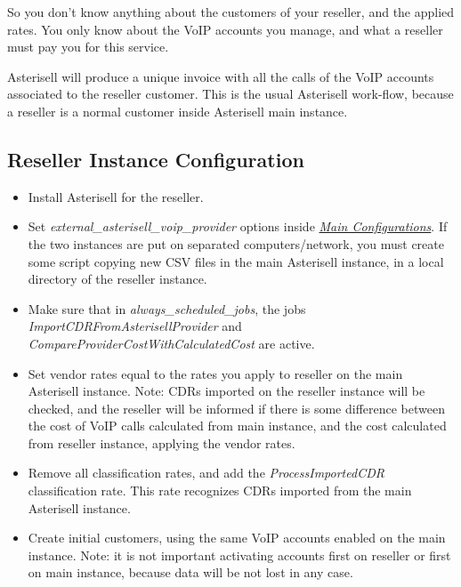 \documentclass[letterpaper,10pt,english]{sphinxmanual}
\begin{document}
So you don't know anything about the customers of your reseller, and the applied rates. You only know about the VoIP accounts you manage, and what a reseller must pay you for this service.

Asterisell will produce a unique invoice with all the calls of the VoIP accounts associated to the reseller customer. This is the usual Asterisell work-flow, because a reseller is a normal customer inside Asterisell main instance.


\subsection{Reseller Instance Configuration}
\label{index:reseller-instance-configuration}\begin{itemize}
\item {} 
Install Asterisell for the reseller.

\item {} 
Set \emph{external\_asterisell\_voip\_provider} options inside {\hyperref[index:main-configurations]{\emph{Main Configurations}}}. If the two instances are put on separated computers/network, you must create some script copying new CSV files in the main Asterisell instance, in a local directory of the reseller instance.

\item {} 
Make sure that in \emph{always\_scheduled\_jobs}, the jobs \emph{ImportCDRFromAsterisellProvider} and \emph{CompareProviderCostWithCalculatedCost} are active.

\item {} 
Set vendor rates equal to the rates you apply to reseller on the main Asterisell instance. Note: CDRs imported on the reseller  instance will be checked, and the reseller will be informed if there is some difference between the cost of VoIP calls calculated from main  instance, and the cost calculated from reseller  instance, applying the vendor rates.

\item {} 
Remove all classification rates, and add the \emph{ProcessImportedCDR} classification rate. This rate recognizes CDRs imported from the main Asterisell instance.

\item {} 
Create initial customers, using the same VoIP accounts enabled on the main instance. Note: it is not important activating accounts first on reseller or first on main instance, because data will be not lost in any case.

\end{itemize}
\end{document}
